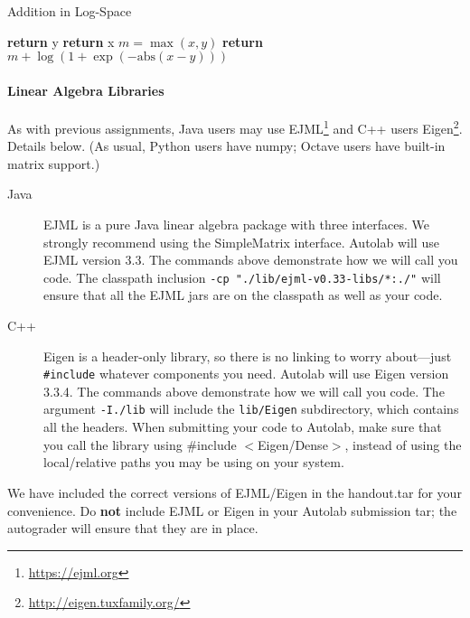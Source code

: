 \documentclass{article}
\begin{document}
\begin{algorithm}[H]
  \caption{Addition in Log-Space}
  \label{alg:logsumexp}
  \begin{algorithmic}[1]
            \State \textbf{return} y
        \EndIf
            \State \textbf{return} x
        \EndIf
        \State $m = \max(x, y)$
        \State \textbf{return} $m + \log(1 + \exp(- \text{abs}(x - y)))$
    \EndProcedure
  \end{algorithmic}
\end{algorithm}

\begin{notebox}
\paragraph{Linear Algebra Libraries} As with previous assignments, Java users may use EJML\footnote{\url{https://ejml.org}} and C++ users Eigen\footnote{\url{http://eigen.tuxfamily.org/}}. Details below. 
%
(As usual, Python users have numpy; Octave users have built-in matrix support.)
%
\begin{description}
\item[Java] EJML is a pure Java linear algebra package with three interfaces. We strongly recommend using the SimpleMatrix interface. Autolab will use EJML version 3.3. The commands above demonstrate how we will call you code. The classpath inclusion \lstinline{-cp "./lib/ejml-v0.33-libs/*:./"} will ensure that all the EJML jars are on the classpath as well as your code. 
\item[C++] Eigen is a header-only library, so there is no linking to worry about---just \lstinline{#include} whatever components you need. Autolab will use Eigen version 3.3.4. The commands above demonstrate how we will call you code. The argument \lstinline{-I./lib} will include the \lstinline{lib/Eigen} subdirectory, which contains all the headers. When submitting your code to Autolab, make sure that you call the library using \#include $<$Eigen/Dense$>$, instead of using the local/relative paths you may be using on your system.
\end{description} 
We have included the correct versions of EJML/Eigen in the handout.tar for your convenience. Do {\bf not} include EJML or Eigen in your Autolab submission tar; the autograder will ensure that they are in place. 
\end{notebox}
    
\end{document}
